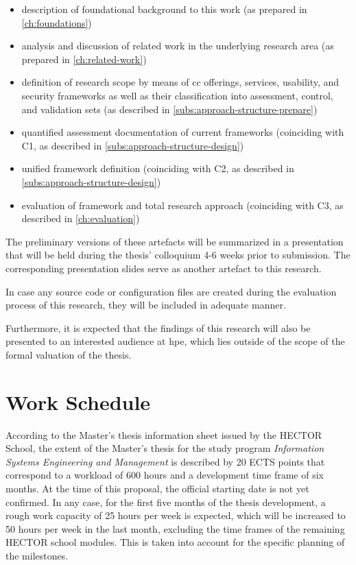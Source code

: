 	\begin{itemize}
		\item description of foundational background to this work (as prepared in \autoref{ch:foundations})
		\item analysis and discussion of related work in the underlying research area (as prepared in \autoref{ch:related-work})
		\item definition of research scope by means of \ac{cc} offerings, services, usability, and security frameworks as well as their classification into assessment, control, and validation sets (as described in \autoref{subs:approach-structure-prepare})
		\item quantified assessment documentation of current frameworks (coinciding with C1, as described in \autoref{subs:approach-structure-design})
		\item unified framework definition (coinciding with C2, as described in \autoref{subs:approach-structure-design})
		\item evaluation of framework and total research approach (coinciding with C3, as described in \autoref{ch:evaluation})
	\end{itemize}
	
	The preliminary versions of these artefacts will be summarized in a presentation that will be held during the thesis' colloquium 4-6 weeks prior to submission. The corresponding presentation slides serve as another artefact to this research.
	
	In case any source code or configuration files are created during the evaluation process of this research, they will be included in adequate manner.
	
	Furthermore, it is expected that the findings of this research will also be presented to an interested audience at \ac{hpe}, which lies outside of the scope of the formal valuation of the thesis.


	\section{Work Schedule} \label{sec:organization-schedule}
	According to the Master's thesis information sheet issued by the HECTOR School, the extent of the Master's thesis for the study program \textit{Information Systems Engineering and Management} is described by 20 ECTS points that correspond to a workload of 600 hours and a development time frame of six months. At the time of this proposal, the official starting date is not yet confirmed. In any case, for the first five months of the thesis development, a rough work capacity of 25 hours per week is expected, which will be increased to 50 hours per week in the last month, excluding the time frames of the remaining HECTOR school modules. This is taken into account for the specific planning of the milestones.
	

